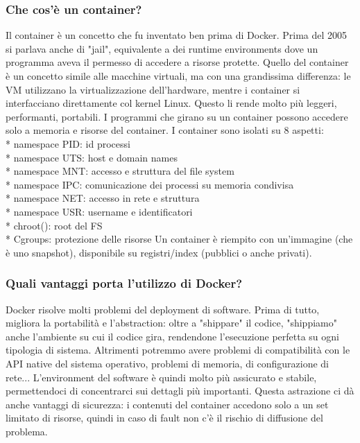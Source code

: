 \documentclass[11pt]{article}
\begin{document}
\subsubsection{Che cos'è un container?}
Il container è un concetto che fu inventato ben prima di Docker. Prima del 2005 si parlava anche di "jail", equivalente a dei runtime environments dove un programma aveva il permesso di accedere a risorse protette. Quello del container è un concetto simile alle macchine virtuali, ma con una grandissima differenza: le VM utilizzano la virtualizzazione dell'hardware, mentre i container si interfacciano direttamente col kernel Linux. Questo li rende molto più leggeri, performanti, portabili. I programmi che girano su un container possono accedere solo a memoria e risorse del container. I container sono isolati su 8 aspetti:
\\* namespace PID: id processi 
\\* namespace UTS: host e domain names 
\\* namespace MNT: accesso e struttura del file system
\\* namespace IPC: comunicazione dei processi su memoria condivisa
\\* namespace NET: accesso in rete e struttura 
\\* namespace USR: username e identificatori 
\\* chroot(): root del FS
\\* Cgroups: protezione delle risorse
Un container è riempito con un'immagine (che è uno snapshot), disponibile su registri/index (pubblici o anche privati).

\subsubsection{Quali vantaggi porta l'utilizzo di Docker?}
Docker risolve molti problemi del deployment di software. Prima di tutto, migliora la portabilità e l'abstraction: oltre a "shippare" il codice, "shippiamo" anche l'ambiente su cui il codice gira, rendendone l'esecuzione perfetta su ogni tipologia di sistema. Altrimenti potremmo avere problemi di compatibilità con le API native del sistema operativo, problemi di memoria, di configurazione di rete... L'environment del software è quindi molto più assicurato e stabile, permettendoci di concentrarci sui dettagli più importanti. Questa astrazione ci dà anche vantaggi di sicurezza: i contenuti del container accedono solo a un set limitato di risorse, quindi in caso di fault non c'è il rischio di diffusione del problema. 
\end{document}
